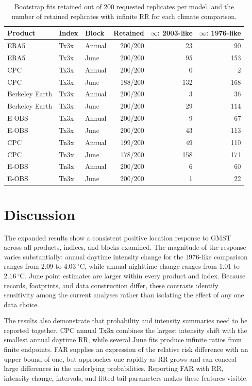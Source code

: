 \documentclass[11pt]{article}
\begin{document}
\begin{table}[htbp]
\centering\small
\caption{Bootstrap fits retained out of 200 requested replicates per model, and the number of retained replicates with infinite RR for each climate comparison.}
\label{tab:bootstrap}
\renewcommand{\arraystretch}{1.12}
\begin{tabular}{lllrrr}\toprule
Product & Index & Block & Retained & $\infty$: 2003-like & $\infty$: 1976-like\\\midrule
ERA5 & Tx3x & Annual & 200/200 & 23 & 90\\
ERA5 & Tx3x & June & 200/200 & 95 & 153\\
CPC & Tx3x & Annual & 200/200 & 0 & 2\\
CPC & Tx3x & June & 188/200 & 132 & 168\\
Berkeley Earth & Tx3x & Annual & 200/200 & 3 & 36\\
Berkeley Earth & Tx3x & June & 200/200 & 29 & 114\\
E-OBS & Tx3x & Annual & 200/200 & 9 & 67\\
E-OBS & Tx3x & June & 200/200 & 43 & 113\\
\midrule
CPC & Tn3x & Annual & 199/200 & 49 & 110\\
CPC & Tn3x & June & 178/200 & 158 & 171\\
E-OBS & Tn3x & Annual & 200/200 & 6 & 60\\
E-OBS & Tn3x & June & 200/200 & 1 & 22\\
\bottomrule\end{tabular}
\end{table}

\section{Discussion}
The expanded results show a consistent positive location response to
GMST across all products, indices, and blocks examined. The magnitude
of the response varies substantially: annual daytime intensity change
for the 1976-like comparison ranges from 2.09 to
$4.03\ ^{\circ}\mathrm{C}$, while annual nighttime change ranges from
1.01 to $2.16\ ^{\circ}\mathrm{C}$. June point estimates are larger
within every product and index. Because records, footprints, and data
construction differ, these contrasts identify sensitivity among the
current analyses rather than isolating the effect of any one data choice.

The results also demonstrate that probability and intensity summaries
need to be reported together. CPC annual Tx3x combines the largest
intensity shift with the smallest annual daytime RR, while several
June fits produce infinite ratios from finite endpoints. FAR supplies
an expression of the relative risk difference with an upper bound of
one, but approaches
one rapidly as RR grows and can conceal large differences in the
underlying probabilities. Reporting FAR with RR, intensity change,
intervals, and fitted tail parameters makes these features visible.
\end{document}
